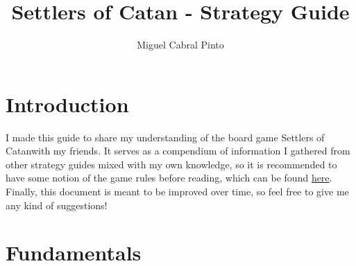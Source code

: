 \documentclass[12pt]{article}
\title{\textbf{Settlers of Catan - Strategy Guide}}
\author{Miguel Cabral Pinto}
\date{}
\begin{document}
\maketitle
\renewcommand{\contentsname}{Contents}
\tableofcontents
\newpage

\section{Introduction}
I made this guide to share my understanding of the board game Settlers of Catan\texttrademark\space with my friends.
It serves as a compendium of information I gathered from other strategy guides mixed with my own knowledge, so it is recommended to have some notion of the game rules before reading, which can be found \href{https://colonist.io/catan-rules}{here}.
Finally, this document is meant to be improved over time, so feel free to give me any kind of suggestions!

\section{Fundamentals}
\end{document}
